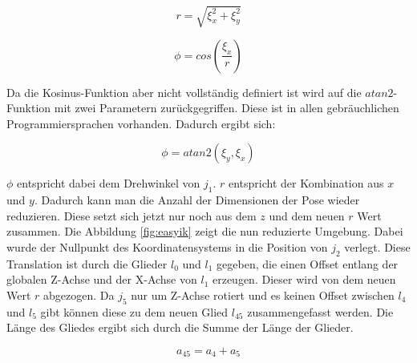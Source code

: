 \begin{equation}
r = \sqrt{\xi_x^2 + \xi_y^2}
\label{eq:5}
\end{equation}

\begin{equation}
\phi = cos(\dfrac{\xi_x}{r})
\label{eq:6}
\end{equation}

Da die Kosinus-Funktion aber nicht vollständig definiert ist wird auf die $atan2$-Funktion mit zwei Parametern zurückgegriffen. Diese ist in allen gebräuchlichen Programmiersprachen vorhanden. Dadurch ergibt sich:

\begin{equation}
\phi = atan2(\xi_y,\xi_x)
\label{eq:7}
\end{equation}

$\phi$ entspricht dabei dem Drehwinkel von $j_1$. $r$ entspricht der Kombination aus $x$ und $y$. Dadurch kann man die Anzahl der Dimensionen der Pose wieder reduzieren. Diese setzt sich jetzt nur noch aus dem $z$ und dem neuen $r$ Wert zusammen. Die Abbildung \ref{fig:easyik} zeigt die nun reduzierte Umgebung. Dabei wurde der Nullpunkt des Koordinatensystems in die Position von $j_2$ verlegt. Diese Translation ist durch die Glieder $l_0$ und $l_1$ gegeben, die einen Offset entlang der globalen Z-Achse und der X-Achse von $l_1$ erzeugen. Dieser wird von dem neuen Wert $r$ abgezogen. Da $j_5$ nur um Z-Achse rotiert und es keinen Offset zwischen $l_4$ und $l_5$ gibt können diese zu dem neuen Glied $l_{45}$ zusammengefasst werden. Die Länge des Gliedes ergibt sich durch die Summe der Länge der Glieder.

\begin{equation}
a_{45} = a_{4} +a_{5}
\label{eq:8}
\end{equation}

